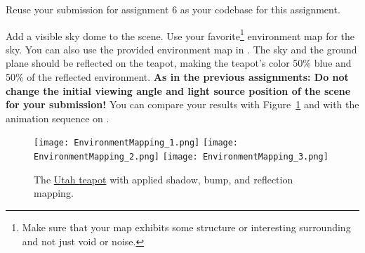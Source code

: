 \documentclass[12pt, a4paper, oneside, ngerman]{article}
\begin{document}






Reuse your submission for assignment 6 as your codebase for this assignment.

Add a visible sky dome to the scene. Use your favorite\footnote{Make sure that your map exhibits some structure or interesting surrounding and not just void or noise.} environment map for the sky. You can also use the provided environment map in \Moodle. The sky and the ground plane should be reflected on the teapot, making the teapot's color 50\% blue and 50\% of the reflected environment.
\textbf{As in the previous assignments: Do not change the initial viewing angle and light source position of the scene for your submission!}
You can compare your results with Figure~\ref{fig:sky} and with the animation sequence on \Moodle.

\begin{figure}[b]
  \centering
  \texttt{[image: EnvironmentMapping\_1.png]}
  \texttt{[image: EnvironmentMapping\_2.png]}
  \texttt{[image: EnvironmentMapping\_3.png]}
  \caption{The \href{http://en.wikipedia.org/wiki/Utah_teapot}{Utah teapot} with applied shadow, bump, and reflection mapping.}
  \label{fig:sky}
\end{figure}
\end{document}
